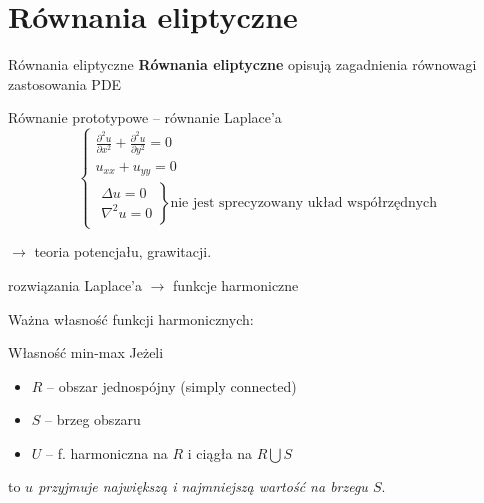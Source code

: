 \section{Równania eliptyczne}

\begin{frame}{Równania eliptyczne}
  \textbf{Równania eliptyczne} opisują zagadnienia równowagi zastosowania PDE

  \begin{block}{Równanie prototypowe -- równanie Laplace'a}
    $$\left\{ \begin{array}{l}
    \frac{{\partial}^2u}{{\partial}x^2} + \frac{{\partial}^2u}{{\partial}y^2} = 0 \\
    u_{xx} + u_{yy} = 0 \\
    \left. \begin{array}{l}
    \Delta u = 0 \\
    {\nabla}^2 u = 0
    \end{array} \right\} \text{nie jest sprecyzowany układ współrzędnych}
    \end{array} \right.$$
  \end{block}
  $\rightarrow$ teoria potencjału, grawitacji.
\end{frame}

\begin{frame}
  rozwiązania Laplace'a $\rightarrow$ funkcje harmoniczne

  Ważna własność funkcji harmonicznych:
  \begin{block}{Własność min-max}
    Jeżeli
    \begin{itemize}
      \item $R$ -- obszar jednospójny (simply connected)
      \item $S$ -- brzeg obszaru
      \item $U$ -- f. harmoniczna na $R$ i ciągła na $R \bigcup S$ %
    \end{itemize}

    to \textit{$u$ przyjmuje największą i najmniejszą wartość na brzegu $S$}.
  \end{block}
\end{frame}
